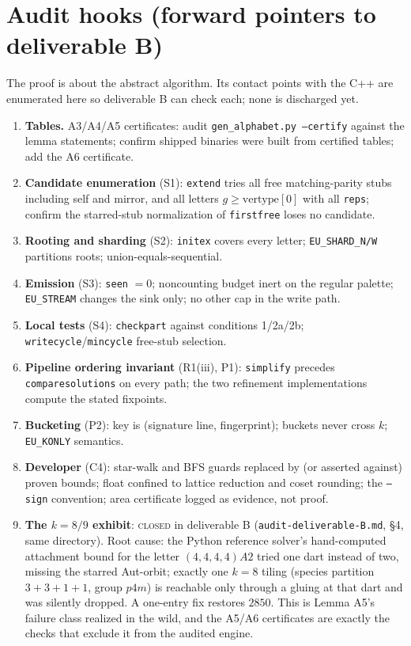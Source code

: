 \documentclass[11pt]{article}
\theoremstyle{definition}
\begin{document}
\section{Audit hooks (forward pointers to deliverable B)}\label{sec:audit}

The proof is about the abstract algorithm. Its contact points with the C++ are
enumerated here so deliverable B can check each; none is discharged yet.

\begin{enumerate}
\item \textbf{Tables.} A3/A4/A5 certificates: audit \texttt{gen\_alphabet.py --certify}
  against the lemma statements; confirm shipped binaries were built from certified
  tables; add the A6 certificate.
\item \textbf{Candidate enumeration} (S1): \texttt{extend} tries all free matching-parity
  stubs including self and mirror, and all letters $g \ge \mathrm{vertype}[0]$ with all
  \texttt{reps}; confirm the starred-stub normalization of \texttt{firstfree} loses no
  candidate.
\item \textbf{Rooting and sharding} (S2): \texttt{initex} covers every letter;
  \texttt{EU\_SHARD\_N/W} partitions roots; union-equals-sequential.
\item \textbf{Emission} (S3): \texttt{seen} $= 0$; noncounting budget inert on the
  regular palette; \texttt{EU\_STREAM} changes the sink only; no other cap in the write
  path.
\item \textbf{Local tests} (S4): \texttt{checkpart} against conditions 1/2a/2b;
  \texttt{writecycle}/\texttt{mincycle} free-stub selection.
\item \textbf{Pipeline ordering invariant} (R1(iii), P1): \texttt{simplify} precedes
  \texttt{comparesolutions} on every path; the two refinement implementations compute
  the stated fixpoints.
\item \textbf{Bucketing} (P2): key is (signature line, fingerprint); buckets never cross
  $k$; \texttt{EU\_KONLY} semantics.
\item \textbf{Developer} (C4): star-walk and BFS guards replaced by (or asserted
  against) proven bounds; float confined to lattice reduction and coset rounding; the
  \texttt{--sign} convention; area certificate logged as evidence, not proof.
\item \textbf{The $k=8/9$ exhibit}: \textsc{closed} in deliverable B
  (\texttt{audit-deliverable-B.md}, \S4, same directory). Root cause: the
  Python reference solver's hand-computed attachment bound for the letter
  $(4,4,4,4)A2$ tried one dart instead of two, missing the starred Aut-orbit; exactly
  one $k=8$ tiling (species partition $3{+}3{+}1{+}1$, group $p4m$) is reachable only
  through a gluing at that dart and was silently dropped. A one-entry fix restores
  $2850$. This is Lemma A5's failure class realized in the wild, and the A5/A6
  certificates are exactly the checks that exclude it from the audited engine.
\end{enumerate}
\end{document}
